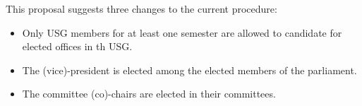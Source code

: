 This proposal suggests three changes to the current procedure: \begin{itemize}
	\item Only USG members for at least one semester are allowed to candidate for elected offices in th USG. 
	\item The (vice)-president is elected among the elected members of the parliament.
	\item The committee (co)-chairs are elected in their committees.
\end{itemize}